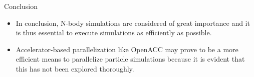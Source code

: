 \documentclass[aspectratio=169]{beamer}
\begin{document}

\begin{frame}[fragile]{Conclusion}

\begin{itemize}
\item In conclusion, N-body simulations are considered of great importance and it is thus essential to execute simulations as efficiently as possible.
\item Accelerator-based parallelization like OpenACC may prove to be a more efficient means to parallelize particle simulations because it is evident that this has not been explored thoroughly.
\end{itemize}



\end{frame}
\end{document}
